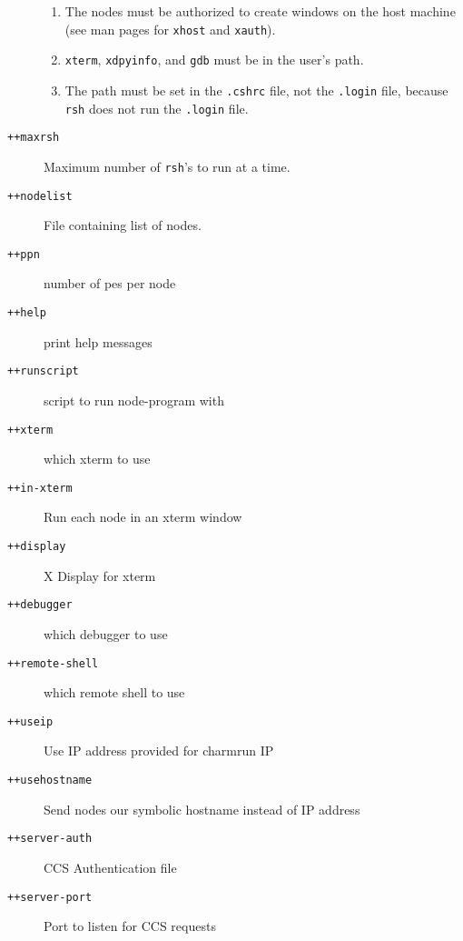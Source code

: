\begin{description}
\begin{enumerate}
\item The nodes must be authorized to create windows on the host machine (see
man pages for {\tt xhost} and {\tt xauth}).

\item {\tt xterm}, {\tt xdpyinfo},  and {\tt gdb} must be in
the user's path.

\item The path must be set in the {\tt .cshrc} file, not the {\tt .login}
file, because {\tt rsh} does not run the {\tt .login} file. 

\end{enumerate}

\item[{\tt ++maxrsh}] Maximum number of {\tt rsh}'s to run at a
time.

\item[{\tt ++nodelist}] File containing list of nodes.


\item[{\tt ++ppn}]              number of pes per node

\item[{\tt ++help}]             print help messages

\item[{\tt ++runscript}]        script to run node-program with

\item[{\tt ++xterm}]            which xterm to use

\item[{\tt ++in-xterm}]         Run each node in an xterm window

\item[{\tt ++display}]          X Display for xterm

\item[{\tt ++debugger}]         which debugger to use

\item[{\tt ++remote-shell}]     which remote shell to use

\item[{\tt ++useip}]            Use IP address provided for charmrun IP

\item[{\tt ++usehostname}]      Send nodes our symbolic hostname instead of IP address

\item[{\tt ++server-auth}]      CCS Authentication file

\item[{\tt ++server-port}]      Port to listen for CCS requests


\end{description}
